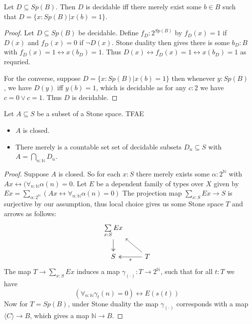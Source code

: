 \begin{lemma}
  Let $D\subseteq Sp(B)$. 
  Then $D$ is decidable iff there merely exist some $b\in B$ such that 
  $D = \{x:Sp(B) | x(b) = 1\}$. 
\end{lemma}
\begin{proof}
  Let $D\subseteq Sp(B)$ be decidable. 
  Define $f_D:2^{Sp(B)}$ by $f_D(x) = 1$ if $D(x)$ and $f_D(x) = 0$ if $\neg D(x)$.
  Stone duality then gives there is some $b_D:B$ with 
  $f_D(x) = 1 \leftrightarrow x(b_D) = 1$. 
  Thus $D(x) \leftrightarrow f_D(x) = 1 \leftrightarrow x(b_D) = 1$ as requried. 

  For the converse, suppose $D  = \{x : Sp(B) | x(b) = 1\}$ then 
  whenever $y:Sp(B)$, we have $D(y)$ iff $y(b) = 1$, which is decidable
  as for any $c:2$ we have $c = 0 \vee c = 1$. 
  Thus $D$ is decidable. 
\end{proof}

\begin{lemma}
  Let $A\subseteq S$ be a subset of a Stone space. TFAE
  \begin{itemize}
    \item $A$ is closed. 
    \item There merely is a countable set set of decidable subsets $D_n\subseteq S$ with 
      $A = \bigcap_{n:\mathbb N} D_n$. 
  \end{itemize}
\end{lemma}
\begin{proof}
  Suppose $A$ is closed. So for each $x: S$ there merely exists some 
  $\alpha:2^\mathbb N$ with $A x \leftrightarrow (\forall_{n:\mathbb N}\alpha(n) = 0$. 
  Let $E$ be a dependent family of types over $X$ given by
  $E x  = \sum\limits_{\alpha:2^\mathbb N} 
  (A x \leftrightarrow \forall_{n:\mathbb N} \alpha(n) = 0)$
  The projection map $\sum\limits_{x: S} E x \to S$ is surjective by our assumption, 
  thus local choice gives us some Stone space $T$ and arrows as follows:
  \begin{equation}\begin{tikzcd}
    \sum\limits_{x:S}E x \arrow[d,""',two heads]\\
    S & \arrow[l, "", two heads,"s"] T\arrow[lu, ""']
  \end{tikzcd}\end{equation}  
  The map $T\to \sum\limits_{x:S} E x $ induces a map $\gamma_{(\cdot)}:T \to 2^\mathbb N$, 
  such that for all $t:T$ we have 
  \begin{equation}
    (\forall_{n:\mathbb N} \gamma_t(n)  = 0 )\leftrightarrow E ( s (t))
  \end{equation}
  Now for $T = Sp(B)$, under Stone duality the map $\gamma_{(\cdot )}$ 
  corresponds with a map $\langle C \rangle \to B$, 
  which gives a map $\mathbb N \to B$. 



\end{proof}




